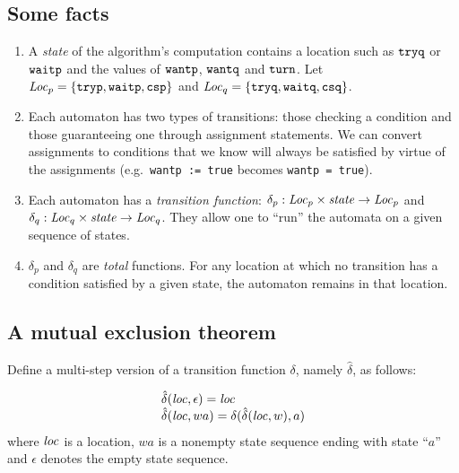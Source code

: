\documentclass[12pt]{article}
\newcommand{\tid}[1]{\mbox{\tt #1\/}}
\newcommand{\id}[1]{\mbox{\it #1\/}}
\begin{document}
\subsection*{Some facts}
\begin{enumerate}
\item A {\em state\/} of the algorithm's computation contains a location 
such as $\tid{tryq}$ or $\tid{waitp}$ and the values of $\tid{wantp}$, $\tid{wantq}$ and $\tid{turn}$.
Let $\id{Loc}_p=\{\tid{tryp},\tid{waitp},\tid{csp}\}$ and
$\id{Loc}_q = \{\tid{tryq},\tid{waitq},\tid{csq}\}$.

\item Each automaton has two types of transitions: those checking a condition and those guaranteeing one
through assignment statements.
We can convert assignments to conditions that we know will always be satisfied by virtue of the assignments
(e.g.\ {\tt wantp := true} becomes {\tt wantp = true}).

\item Each automaton has a
{\em transition function\/}: $\delta_p : \id{Loc}_p\times\id{state}\rightarrow\id{Loc}_p$
and $\delta_q : \id{Loc}_q\times\id{state}\rightarrow\id{Loc}_q$.
They allow one to ``run'' the automata on a given sequence of states.

\item $\delta_p$ and $\delta_q$ are {\em total\/} functions.
For any location at which no transition has a condition satisfied by a given state, the automaton remains
in that location.
\end{enumerate}

\subsection*{A mutual exclusion theorem}

\noindent Define a multi-step version of a transition function $\delta$,
namely $\hat{\delta}$, as follows:

\[
\begin{array}{l}
\hat{\delta}(\id{loc},\epsilon) = \id{loc} \\
\hat{\delta}(\id{loc}, wa) = \delta(\hat{\delta}(\id{loc},w),a)
\end{array}
\]
where $\id{loc}$ is a location, $wa$ is a nonempty state sequence ending with state ``$a$''
and $\epsilon$ denotes the empty state sequence.
\end{document}
